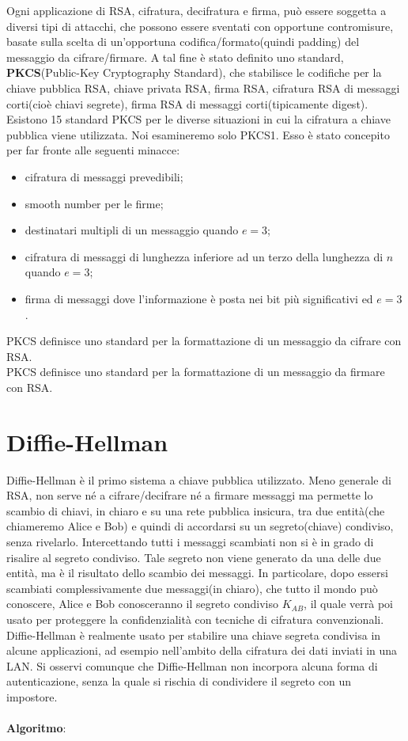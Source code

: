Ogni applicazione di RSA, cifratura, decifratura e firma, può essere soggetta a diversi tipi di attacchi, che possono essere sventati con opportune contromisure, basate sulla scelta di un'opportuna codifica/formato(quindi padding) del messaggio da cifrare/firmare. A tal fine è stato definito uno standard, \textbf{PKCS}(Public-Key Cryptography Standard), che stabilisce le codifiche per la chiave pubblica RSA, chiave privata RSA, firma RSA, cifratura RSA di messaggi corti(cioè chiavi segrete), firma RSA di messaggi corti(tipicamente digest). \\
Esistono 15 standard PKCS per le diverse situazioni in cui la cifratura a chiave pubblica viene utilizzata. Noi esamineremo solo PKCS1. Esso è stato concepito per far fronte alle seguenti minacce:
\begin{itemize}
\item cifratura di messaggi prevedibili;
\item smooth number per le firme;
\item destinatari multipli di un messaggio quando $e=3$;
\item cifratura di messaggi di lunghezza inferiore ad un terzo della lunghezza di $n$ quando $e=3$;
\item firma di messaggi dove l'informazione è posta nei bit più significativi ed $e = 3$.
\end{itemize}
PKCS definisce uno standard per la formattazione di un messaggio da cifrare con RSA. \\
PKCS definisce uno standard per la formattazione di un messaggio da firmare con RSA.

\section{Diffie-Hellman}

Diffie-Hellman è il primo sistema a chiave pubblica utilizzato. Meno generale di RSA, non serve né a cifrare/decifrare né a firmare messaggi ma permette lo scambio di chiavi, in chiaro e su una rete pubblica insicura, tra due entità(che chiameremo Alice e Bob) e quindi di accordarsi su un segreto(chiave) condiviso, senza rivelarlo. Intercettando tutti i messaggi scambiati non si è in grado di risalire al segreto condiviso. Tale segreto non viene generato da una delle due entità, ma è il risultato dello scambio dei messaggi. In particolare, dopo essersi scambiati complessivamente due messaggi(in chiaro), che tutto il mondo può conoscere, Alice e Bob conosceranno il segreto condiviso $K_{AB}$, il quale verrà poi usato per proteggere la confidenzialità con tecniche di cifratura convenzionali. \\ Diffie-Hellman è realmente usato per stabilire una chiave segreta condivisa in alcune applicazioni, ad esempio nell'ambito della cifratura dei dati inviati in una LAN. Si osservi comunque che Diffie-Hellman non
incorpora alcuna forma di autenticazione, senza la quale si rischia di condividere il segreto con un impostore.  \\ \\
\textbf{Algoritmo}: \\

